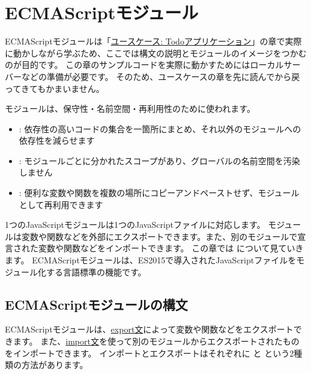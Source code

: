 \hypertarget{module}{%
\chapter[ECMAScriptモジュール]{ECMAScriptモジュール\,\protect{}}\label{module}}
\thispagestyle{frontheadings}

ECMAScriptモジュールは「\hyperlink{todo-app}{ユースケース: Todoアプリケーション}」の章で実際に動かしながら学ぶため、ここでは構文の説明とモジュールのイメージをつかむのが目的です。
この章のサンプルコードを実際に動かすためにはローカルサーバーなどの準備が必要です。
そのため、ユースケースの章を先に読んでから戻ってきてもかまいません。

モジュールは、保守性・名前空間・再利用性のために使われます。

\begin{itemize}
\item
  :
  依存性の高いコードの集合を一箇所にまとめ、それ以外のモジュールへの依存性を減らせます
\item
  :
  モジュールごとに分かれたスコープがあり、グローバルの名前空間を汚染しません
\item
  :
  便利な変数や関数を複数の場所にコピーアンドペーストせず、モジュールとして再利用できます
\end{itemize}

1つのJavaScriptモジュールは1つのJavaScriptファイルに対応します。
モジュールは変数や関数などを外部にエクスポートできます。また、別のモジュールで宣言された変数や関数などをインポートできます。
この章では
\textbf{}
について見ていきます。
ECMAScriptモジュールは、ES2015で導入されたJavaScriptファイルをモジュール化する言語標準の機能です。

\hypertarget{es-module-syntax}{%
\section{ECMAScriptモジュールの構文}\label{es-module-syntax}}

ECMAScriptモジュールは、\href{https://developer.mozilla.org/ja/docs/Web/JavaScript/Reference/Statements/export}{export文}によって変数や関数などをエクスポートできます。
また、\href{https://developer.mozilla.org/ja/docs/Web/JavaScript/Reference/Statements/import}{import文}を使って別のモジュールからエクスポートされたものをインポートできます。
インポートとエクスポートはそれぞれに \textbf{}と
\textbf{}という2種類の方法があります。

